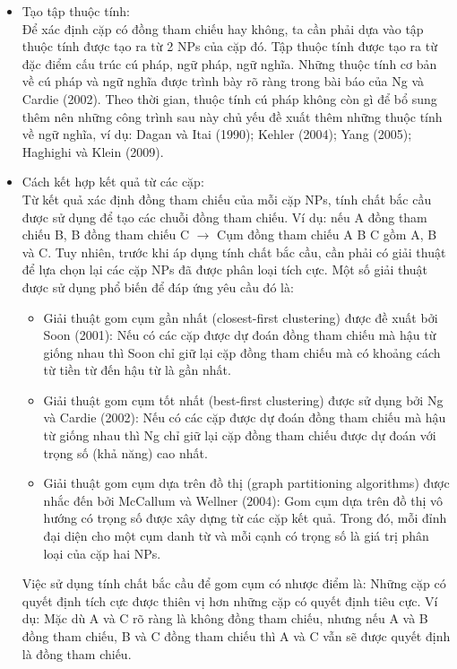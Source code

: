 \documentclass[12pt]{extarticle}
\begin{document}
				\begin{itemize}
					\item{Tạo tập thuộc tính: 
						\\Để xác định cặp có đồng tham chiếu hay không, ta cần phải dựa vào tập thuộc tính được tạo ra từ 2 NPs của cặp đó. Tập thuộc tính được tạo ra từ đặc điểm cấu trúc cú pháp, ngữ pháp, ngữ nghĩa. Những thuộc tính cơ bản về cú pháp và ngữ nghĩa được trình bày rõ ràng trong bài báo của Ng và Cardie (2002)\cite{ng02}. Theo thời gian, thuộc tính cú pháp không còn gì để bổ sung thêm nên những công trình sau này chủ yếu đề xuất thêm những thuộc tính về ngữ nghĩa, ví dụ: Dagan và Itai (1990)\cite{dagan90}; Kehler (2004)\cite{kehler04}; Yang (2005)\cite{yang05}; Haghighi và Klein (2009)\cite{haghighi09}.}
					\item{Cách kết hợp kết quả từ các cặp: 
						\\Từ kết quả xác định đồng tham chiếu của mỗi cặp NPs, tính chất bắc cầu được sử dụng để tạo các chuỗi đồng tham chiếu. Ví dụ: nếu A đồng tham chiếu B, B đồng tham chiếu C $\rightarrow$ Cụm đồng tham chiếu {A B C} gồm A, B và C. Tuy nhiên, trước khi áp dụng tính chất bắc cầu, cần phải có giải thuật để lựa chọn lại các cặp NPs đã được phân loại tích cực. Một số giải thuật được sử dụng phổ biến để đáp ứng yêu cầu đó là:
						\begin{itemize}
							\item{Giải thuật gom cụm gần nhất (closest-first clustering) được đề xuất bởi Soon (2001)\cite{soon01}: Nếu có các cặp được dự đoán đồng tham chiếu mà hậu từ giống nhau thì Soon chỉ giữ lại cặp đồng tham chiếu mà có khoảng cách từ tiền từ đến hậu từ là gần nhất.}
							\item{Giải thuật gom cụm tốt nhất (best-first clustering) được sử dụng bởi Ng và Cardie (2002)\cite{ng02}: Nếu có các cặp được dự đoán đồng tham chiếu mà hậu từ giống nhau thì Ng chỉ giữ lại cặp đồng tham chiếu được dự đoán với trọng số (khả năng) cao nhất.}
							\item{Giải thuật gom cụm dựa trên đồ thị (graph partitioning algorithms) được nhắc đến bởi McCallum và Wellner (2004)\cite{mccallum04}: Gom cụm dựa trên đồ thị vô hướng có trọng số được xây dựng từ các cặp kết quả. Trong đó, mỗi đỉnh đại diện cho một cụm danh từ và mỗi cạnh có trọng số là giá trị phân loại của cặp hai NPs.}
						\end{itemize}}
						\par  Việc sử dụng tính chất bắc cầu để gom cụm có nhược điểm là: Những cặp có quyết định tích cực được thiên vị hơn những cặp có quyết định tiêu cực. Ví dụ: Mặc dù A và C rõ ràng là không đồng tham chiếu, nhưng nếu A và B đồng tham chiếu, B và C đồng tham chiếu thì A và C vẫn sẽ được quyết định là đồng tham chiếu.
				\end{itemize}			 
\end{document}
